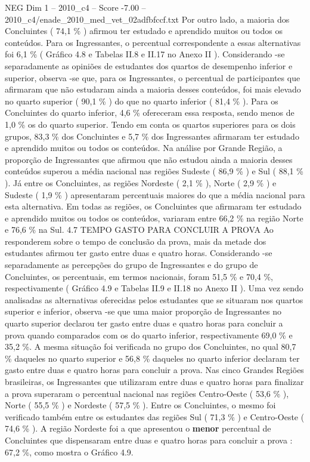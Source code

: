 \begin{textsample}{NEG Dim 1 – 2010\_c4 – Score -7.00 – 2010\_c4/enade\_2010\_med\_vet\_02adfbfccf.txt}
Por outro lado, a maioria dos Concluintes ( 74,1 \% ) afirmou ter estudado e aprendido muitos ou todos os conteúdos.
Para os Ingressantes, o percentual correspondente a essas alternativas foi 6,1 \% ( Gráfico 4.8 e Tabelas II.8 e II.17 no Anexo II ).
Considerando -se separadamente as opiniões de estudantes dos quartos de desempenho inferior e superior, observa -se que, para os Ingressantes, o percentual de participantes que afirmaram que não estudaram ainda a maioria desses conteúdos, foi mais elevado no quarto superior ( 90,1 \% ) do que no quarto inferior ( 81,4 \% ).
Para os Concluintes do quarto inferior, 4,6 \% ofereceram essa resposta, sendo menos de 1,0 \% os do quarto superior.
Tendo em conta os quartos superiores para os dois grupos, 83,3 \% dos Concluintes e 5,7 \% dos Ingressantes afirmaram ter estudado e aprendido muitos ou todos os conteúdos.
Na análise por Grande Região, a proporção de Ingressantes que afirmou que não estudou ainda a maioria desses conteúdos superou a média nacional nas regiões Sudeste ( 86,9 \% ) e Sul ( 88,1 \% ).
Já entre os Concluintes, as regiões Nordeste ( 2,1 \% ), Norte ( 2,9 \% ) e Sudeste ( 1,9 \% ) apresentaram percentuais maiores do que a média nacional para esta alternativa.
Em todas as regiões, os Concluintes que afirmaram ter estudado e aprendido muitos ou todos os conteúdos, variaram entre 66,2 \% na região Norte e 76,6 \% na Sul. 4.7 TEMPO GASTO PARA CONCLUIR A PROVA Ao responderem sobre o tempo de conclusão da prova, mais da metade dos estudantes afirmou ter gasto entre duas e quatro horas.
Considerando -se separadamente as percepções do grupo de Ingressantes e do grupo de Concluintes, os percentuais, em termos nacionais, foram 51,5 \% e 70,4 \%, respectivamente ( Gráfico 4.9 e Tabelas II.9 e II.18 no Anexo II ).
Uma vez sendo analisadas as alternativas oferecidas pelos estudantes que se situaram nos quartos superior e inferior, observa -se que uma maior proporção de Ingressantes no quarto superior declarou ter gasto entre duas e quatro horas para concluir a prova quando comparados com os do quarto inferior, respectivamente 69,0 \% e 35,2 \%.
A mesma situação foi verificada no grupo dos Concluintes, no qual 80,7 \% daqueles no quarto superior e 56,8 \% daqueles no quarto inferior declaram ter gasto entre duas e quatro horas para concluir a prova.
Nas cinco Grandes Regiões brasileiras, os Ingressantes que utilizaram entre duas e quatro horas para finalizar a prova superaram o percentual nacional nas regiões Centro-Oeste ( 53,6 \% ), Norte ( 55,5 \% ) e Nordeste ( 57,5 \% ).
Entre os Concluintes, o mesmo foi verificado também entre os estudantes das regiões Sul ( 71,3 \% ) e Centro-Oeste ( 74,6 \% ).
A região Nordeste foi a que apresentou o \textbf{menor} percentual de Concluintes que dispensaram entre duas e quatro horas para concluir a prova : 67,2 \%, como mostra o Gráfico 4.9.

\end{textsample}
